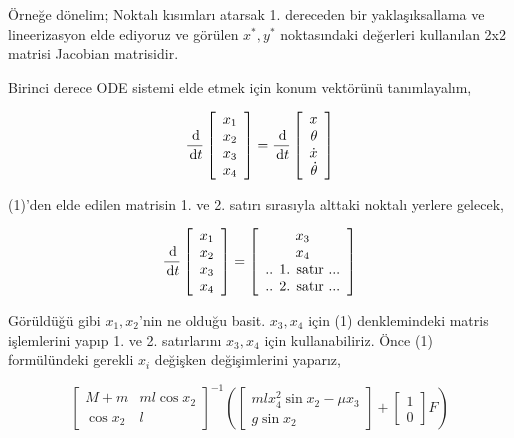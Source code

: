 \documentclass[12pt,fleqn]{article}\usepackage{../../common}
\begin{document}
Örneğe dönelim; Noktalı kısımları atarsak 1. dereceden bir yaklaşıksallama
ve lineerizasyon elde ediyoruz ve görülen $x^*,y^*$ noktasındaki değerleri
kullanılan 2x2 matrisi Jacobian matrisidir.

Birinci derece ODE sistemi elde etmek için konum vektörünü tanımlayalım,

$$
\frac{\,\mathrm{d}}{\,\mathrm{d} t} \left[\begin{array}{r}
x_1 \\ x_2 \\ x_3 \\ x_4
\end{array}\right] = 
\frac{\,\mathrm{d}}{\,\mathrm{d} t} 
\left[\begin{array}{r}
x \\ \theta \\ \dot{x} \\ \dot{\theta}
\end{array}\right]
$$

(1)'den elde edilen matrisin 1. ve 2. satırı sırasıyla alttaki noktalı
yerlere gelecek,

$$
\frac{\,\mathrm{d}}{\,\mathrm{d} t} \left[\begin{array}{rrr}
x_1 \\ x_2 \\ x_3 \\ x_4
\end{array}\right] = 
\left[\begin{array}{c}
x_3 \\ x_4 \\ \textrm{.. 1. satır ...} \\ \textrm{.. 2. satır ...}
\end{array}\right]
$$

Görüldüğü gibi $x_1,x_2$'nin ne olduğu basit. $x_3,x_4$ için (1)
denklemindeki matris işlemlerini yapıp 1. ve 2. satırlarını $x_3,x_4$ için
kullanabiliriz. Önce (1) formülündeki gerekli $x_i$ değişken değişimlerini
yaparız,

$$
\left[\begin{array}{rr}
M+m & m l \cos x_2 \\ \cos x_2 & l
\end{array}\right]^{-1}
\left(
  \left[\begin{array}{c}
  m l x_4^2 \sin x_2 - \mu x_3 \\
  g \sin x_2
  \end{array}\right] + 
  \left[\begin{array}{r}
  1 \\ 0
  \end{array}\right] F
\right)
$$
\end{document}
